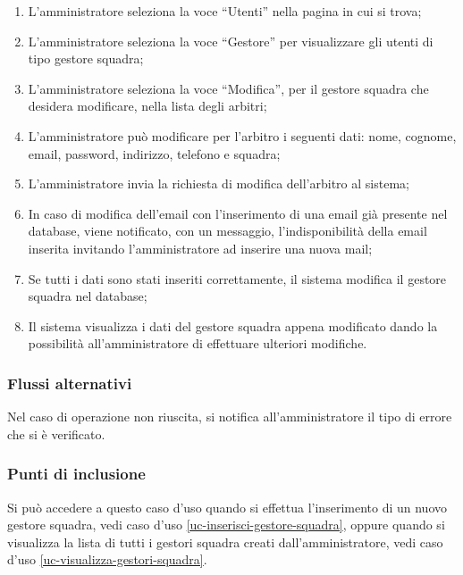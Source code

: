 \begin{enumerate}
	
	\item
	L'amministratore seleziona la voce ``Utenti'' nella pagina in cui si trova;
	
	\item
	L'amministratore seleziona la voce ``Gestore'' per visualizzare gli utenti di tipo gestore squadra;
	
	\item
	L'amministratore seleziona la voce ``Modifica'', per il gestore squadra che desidera modificare, nella lista degli arbitri;
	
	\item
	L'amministratore può modificare per l'arbitro i seguenti dati: nome, cognome, email, password, indirizzo, telefono e squadra;
	
	\item
	L'amministratore invia la richiesta di modifica dell'arbitro al sistema;
	
	\item
	In caso di modifica dell'email con l'inserimento di una email già presente nel database, viene notificato, con un messaggio, l'indisponibilità della email inserita invitando l'amministratore ad inserire una nuova mail;
	
	\item
	Se tutti i dati sono stati inseriti correttamente, il sistema modifica il gestore squadra nel database;
	
	\item
	Il sistema visualizza i dati del gestore squadra appena modificato dando la possibilità all'amministratore di effettuare ulteriori modifiche.
	
\end{enumerate}

\subsubsection*{Flussi alternativi}
Nel caso di operazione non riuscita, si notifica all'amministratore il tipo di errore che si è verificato.

\subsubsection*{Punti di inclusione}
Si può accedere a questo caso d'uso quando si effettua l'inserimento di un nuovo gestore squadra, vedi caso d'uso \vref{uc-inserisci-gestore-squadra}, oppure quando si visualizza la lista di tutti i gestori squadra creati dall'amministratore, vedi caso d'uso \vref{uc-visualizza-gestori-squadra}.


